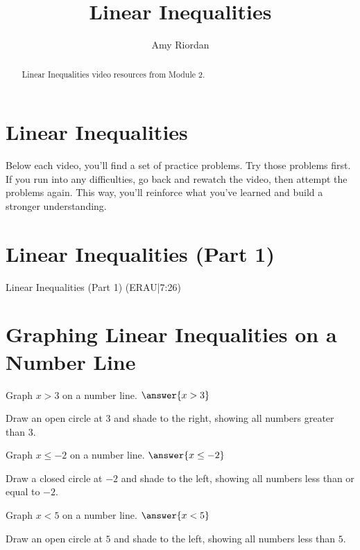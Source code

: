 \documentclass{ximera}
\title{Linear Inequalities}
\author{Amy Riordan}
\begin{document}
\begin{abstract}
Linear Inequalities video resources from Module 2.
\end{abstract}
\maketitle

\section*{Linear Inequalities}

Below each video, you’ll find a set of practice problems. Try those problems first. If you run into any difficulties, go back and rewatch the video, then attempt the problems again. This way, you’ll reinforce what you’ve learned and build a stronger understanding.

\section*{Linear Inequalities (Part 1)}

Linear Inequalities (Part 1) (ERAU|7:26)



\section*{Graphing Linear Inequalities on a Number Line}

\begin{problem}
Graph $x > 3$ on a number line. $\answer{x > 3}$
\begin{feedback}
Draw an open circle at $3$ and shade to the right, showing all numbers greater than $3$.
\end{feedback}
\end{problem}

\begin{problem}
Graph $x \leq -2$ on a number line. $\answer{x \leq -2}$
\begin{feedback}
Draw a closed circle at $-2$ and shade to the left, showing all numbers less than or equal to $-2$.
\end{feedback}
\end{problem}

\begin{problem}
Graph $x < 5$ on a number line. $\answer{x < 5}$
\begin{feedback}
Draw an open circle at $5$ and shade to the left, showing all numbers less than $5$.
\end{feedback}
\end{problem}
\end{document}
